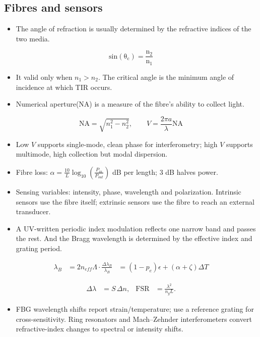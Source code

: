 \documentclass[10pt,a4paper]{ctexart}
\newcommand{\formula}[1]{%
	\par\vspace{1pt}\begingroup
	\setlength{\abovedisplayskip}{0pt}\setlength{\belowdisplayskip}{0pt}
	\[ #1 \]\endgroup\vspace{1pt}}
\begin{document}
\begin{multicols*}{2}
\subsection{Fibres and sensors}
\begin{itemize}
	\item The angle of refraction is usually determined by the refractive indices of the two media.
\end{itemize}
\formula{\mathrm{sin(\theta_c)=\frac{n_2}{n_1}}}
\begin{itemize}
	\item It valid only when \(n_1>n_2\). The critical angle is the minimum angle of incidence at which TIR occurs.
	\item Numerical aperture(NA) is a measure of the fibre's ability to collect light.
\end{itemize}
\formula{\mathrm{NA}=\sqrt{n_1^2-n_2^2},\qquad V=\frac{2\pi a}{\lambda}\mathrm{NA}}
\begin{itemize}
	\item Low \(V\) supports single-mode, clean phase for interferometry; high \(V\) supports multimode, 
	high collection but modal dispersion.
	\item Fibre loss: \(\alpha=\frac{10}{L}\log_{10}(\frac{P_{in}}{P_{out}})\) dB per length; 3 dB halves power.
	\item Sensing variables: intensity, phase, wavelength and polarization. Intrinsic sensors use the fibre itself; 
	extrinsic sensors use the fibre to reach an external transducer.
	\item A UV-written periodic index modulation reflects one narrow band and passes the rest. 
	And the Bragg wavelength is determined by the effective index and grating period.
\end{itemize}
\formula{\begin{aligned}
\lambda_B&=2n_{eff}\Lambda \cdot\frac{\Delta \lambda_B}{\lambda_B} &=(1-p_e)\epsilon+(\alpha+\zeta)\Delta T
\end{aligned}}

\formula{\begin{aligned}
\Delta\lambda&=S\,\Delta n, &\mathrm{FSR}&=\frac{\lambda^2}{n_gL}.
\end{aligned}}
\begin{itemize}
	\item FBG wavelength shifts report strain/temperature; use a reference grating for cross-sensitivity. 
	Ring resonators and Mach--Zehnder interferometers convert refractive-index changes to spectral or intensity shifts.
\end{itemize}


\end{multicols*}
\end{document}
